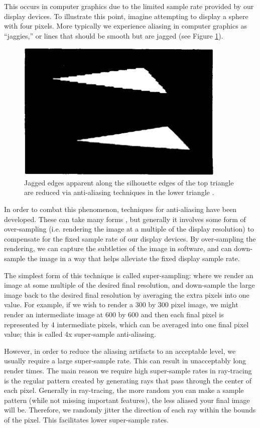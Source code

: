 This occurs in computer graphics due to the limited sample rate provided by our display devices. To illustrate this point, imagine attempting to display a sphere with four pixels. More typically we experience aliasing in computer graphics as “jaggies,” or lines that should be smooth but are jagged (see Figure \ref{fig:jaggies}).

\begin{figure}[h!]
   \centering
   \includegraphics[width=100mm]{../img/jaggies.png}
   \captionfonts
   \caption[Jaggies]{Jagged edges apparent along the silhouette edges of the top triangle are reduced via anti-aliasing techniques in the lower triangle \cite{bib:crow1977}.}
   \label{fig:jaggies}
\end{figure}

In order to combat this phenomenon, techniques for anti-aliasing have been developed. These can take many forms \cite{bib:jimenez2011}, but generally it involves some form of over-sampling (i.e. rendering the image at a multiple of the display resolution) to compensate for the fixed sample rate of our display devices. By over-sampling the rendering, we can capture the subtleties of the image in software, and can down-sample the image in a way that helps alleviate the fixed display sample rate.

The simplest form of this technique is called super-sampling: where we render an image at some multiple of the desired final resolution, and down-sample the large image back to the desired final resolution by averaging the extra pixels into one value. For example, if we wish to render a 300 by 300 pixel image, we might render an intermediate image at 600 by 600 and then each final pixel is represented by 4 intermediate pixels, which can be averaged into one final pixel value; this is called 4x super-sample anti-aliasing.

However, in order to reduce the aliasing artifacts to an acceptable level, we usually require a large super-sample rate. This can result in unacceptably long render times. The main reason we require high super-sample rates in ray-tracing is the regular pattern  created by generating rays that pass through the center of each pixel. Generally in ray-tracing, the more random you can make a sample pattern (while not missing important features), the less aliased your final image will be. Therefore, we randomly jitter the direction of each ray within the bounds of the pixel. This facilitates lower super-sample rates.

